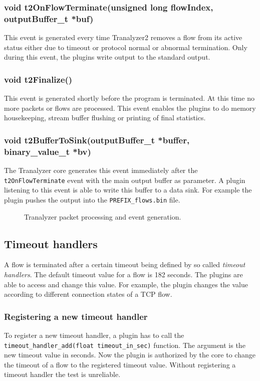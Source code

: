 \documentclass[documentation]{subfiles}
\begin{document}
\subsubsection{void t2OnFlowTerminate(unsigned long flowIndex, outputBuffer\_t *buf)}\label{event:t2OnFlowTerminate}
This event is generated every time Tranalyzer2 removes a flow from its active status either due to timeout or protocol normal or abnormal termination. Only during this event, the plugins write output to the standard output.

\subsubsection{void t2Finalize()}
This event is generated shortly before the program is terminated. At this time no more packets or flows are processed. This event enables the plugins to do memory housekeeping, stream buffer flushing or printing of final statistics.

\subsubsection{void t2BufferToSink(outputBuffer\_t *buffer, binary\_value\_t *bv)}
The Tranalyzer core generates this event immediately after the {\tt t2OnFlowTerminate} event with the main output buffer as parameter. A plugin listening to this event is able to write this buffer to a data sink. For example the  plugin pushes the output into the {\tt PREFIX\_flows.bin} file.

\begin{figure}[ht]
    \centering
    \caption{Tranalyzer packet processing and event generation.}
\end{figure}

\subsection{Timeout handlers}
A flow is terminated after a certain timeout being defined by so called {\em timeout handlers}. The default timeout value for a flow is 182 seconds. The plugins are able to access and change this value. For example, the  plugin changes the value according to different connection states of a TCP flow.

\subsubsection{Registering a new timeout handler}
To register a new timeout handler, a plugin has to call the {\tt timeout\_handler\_add(float timeout\_in\_sec)} function. The argument is the new timeout value in seconds. Now the plugin is authorized by the core to change the timeout of a flow to the registered timeout value. Without registering a timeout handler the test is unreliable.
\end{document}
